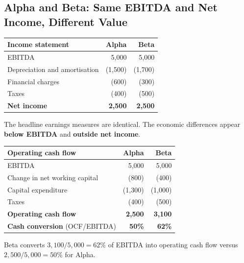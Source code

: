 \subsection{Alpha and Beta: Same EBITDA and Net Income, Different Value}
\begin{exbox}
\begin{center}
\begin{tabular}{@{}lrr@{}}
\toprule
\textbf{Income statement} & \textbf{Alpha} & \textbf{Beta}\\
\midrule
EBITDA & 5,000 & 5,000\\
Depreciation and amortisation & (1,500) & (1,700)\\
Financial charges & (600) & (300)\\
Taxes & (400) & (500)\\
\midrule
\textbf{Net income} & \textbf{2,500} & \textbf{2,500}\\
\bottomrule
\end{tabular}
\end{center}
The headline earnings measures are identical. The economic differences appear \textbf{below EBITDA} and \textbf{outside net income}.
\end{exbox}
\begin{exbox}
\begin{center}
\begin{tabular}{@{}lrr@{}}
\toprule
\textbf{Operating cash flow} & \textbf{Alpha} & \textbf{Beta}\\
\midrule
EBITDA & 5,000 & 5,000\\
Change in net working capital & (800) & (400)\\
Capital expenditure & (1,300) & (1,000)\\
Taxes & (400) & (500)\\
\midrule
\textbf{Operating cash flow} & \textbf{2,500} & \textbf{3,100}\\
\textbf{Cash conversion} (OCF/EBITDA) & \textbf{50\%} & \textbf{62\%}\\
\bottomrule
\end{tabular}
\end{center}
Beta converts $3{,}100/5{,}000=62\%$ of EBITDA into operating cash flow versus $2{,}500/5{,}000=50\%$ for Alpha.
\end{exbox}

